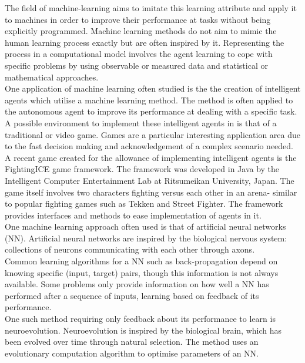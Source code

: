 \documentclass[12pt,a4paper]{article}
\begin{document}
The field of machine-learning aims to imitate this learning attribute and apply it to machines in order to improve their performance at tasks without being explicitly programmed. Machine learning methods do not aim to mimic the human learning process exactly but are often inspired by it. Representing the process in a computational model involves the agent learning to cope with specific problems by using observable or measured data and statistical or mathematical approaches.\\

One application of machine learning often studied is the the creation of intelligent agents which utilise a machine learning method. The method is often applied to the autonomous agent to improve its performance at dealing with a specific task.\\

A possible environment to implement these intelligent agents in is that of a traditional or video game. Games are a particular interesting application area due to the fast decision making and acknowledgement of a complex scenario needed.\\

A recent game created for the allowance of implementing intelligent agents is the FightingICE game framework. The framework was developed in Java by the Intelligent Computer Entertainment Lab at Ritsumeikan University, Japan. The game itself involves two characters fighting versus each other in an arena- similar to popular fighting games such as Tekken and Street Fighter. The framework provides interfaces and methods to ease implementation of agents in it.\\

One machine learning approach often used is that of artificial neural networks (NN). Artificial neural networks are inspired by the biological nervous system: collections of neurons communicating with each other through axons.\\

Common learning algorithms for a NN such as back-propagation depend on knowing specific (input, target) pairs, though this information is not always available. Some problems only provide information on how well a NN has performed after a sequence of inputs, learning based on feedback of its performance.\\

One such method requiring only feedback about its performance to learn is neuroevolution. Neuroevolution is inspired by the biological brain, which has been evolved over time through natural selection. The method uses an evolutionary computation algorithm to optimise parameters of an NN.\\
\end{document}
